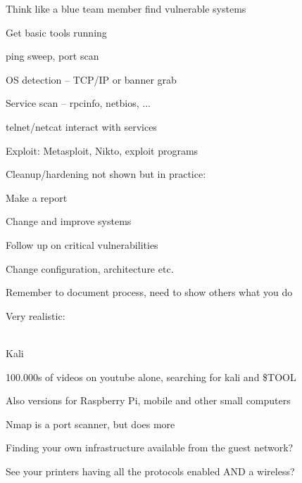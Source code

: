 \documentclass[Screen16to9,17pt]{foils}
\begin{document}
\begin{list1}
\item Think like a blue team member find vulnerable systems
\item Get basic tools running
\begin{list2}
\item ping sweep, port scan
\item OS detection -- TCP/IP or banner grab
\item Service scan -- rpcinfo, netbios, ...
\item telnet/netcat interact with services
\end{list2}
\item Exploit: Metasploit, Nikto, exploit programs
\item Cleanup/hardening not shown but in practice:
\begin{list2}
\item Make a report
\item Change and improve systems
\item Follow up on critical vulnerabilities
\item Change configuration, architecture etc.
\end{list2}
\item Remember to document process, need to show others what you do
\end{list1}





Very realistic:\\
\\




\begin{list1}
\item  Kali 
\item 100.000s of videos on youtube alone, searching for kali and \$TOOL
\item Also versions for Raspberry Pi, mobile and other small computers
\end{list1}



\begin{list2}
\item Nmap is a port scanner, but does more
\item Finding your own infrastructure available from the guest network?
\item See your printers having all the protocols enabled AND a wireless?
\end{list2}
\end{document}
